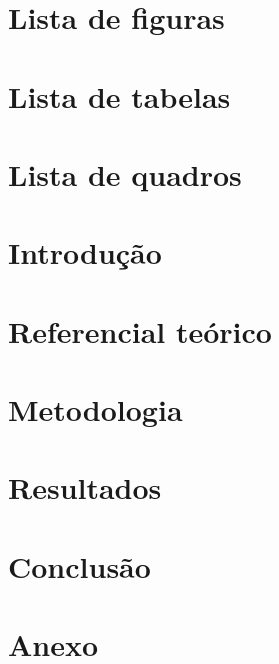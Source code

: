 \documentclass[12pt, a4paper, twoside]{article}
\numberwithin{equation}{subsection} %
\begin{document}
\tableofcontents
\newpage

\section{\textbf{Lista de figuras}}
\newpage

\section{\textbf{Lista de tabelas}}
\newpage

\section{\textbf{Lista de quadros}}
\newpage

\section{\textbf{Introdução}}

\newpage


\section{\textbf{Referencial teórico}}

\newpage

\section{\textbf{Metodologia}}
\newpage

\section{\textbf{Resultados}}

\newpage

% 

\section{\textbf{Conclusão}}
\newpage




\section{\textbf{Anexo}}
\newpage
\end{document}
